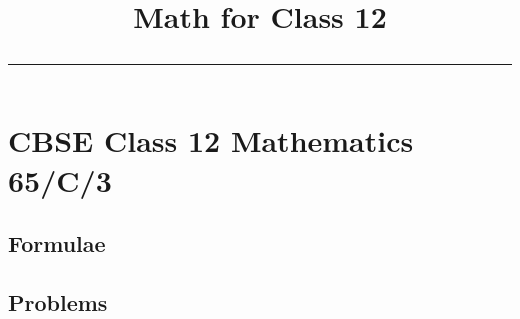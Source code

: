 \documentclass[10pt]{article}
\begin{document}
\onecolumn

\title{
	\begin{center}
	Math for Class 12
	\\
	\rule{0.4\columnwidth}{0.4pt}
	\end{center}
}
\author{}
\date{}
\maketitle

\tableofcontents
\newpage

\renewcommand{\thetable}{\theenumi}

\section{CBSE Class 12 Mathematics 65/C/3}
\subsection{Formulae}
\label{pg:formulae}

\newpage
\subsection{Problems}
\label{pg:problems}

\label{pg:end}
\end{document}
